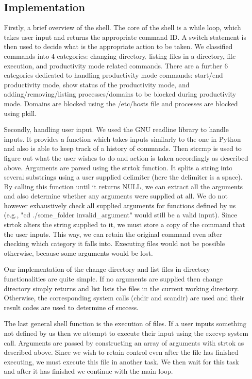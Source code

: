 \documentclass{article}
\begin{document}
\subsection{Implementation}

Firstly, a brief overview of the shell. The core of the shell is a while loop, which takes user input and returns the appropriate command ID. A switch statement is then used to decide what is the appropriate action to be taken. We classified commands into 4 categories: changing directory, listing files in a directory, file execution, and productivity mode related commands. There are a further 6 categories dedicated to handling productivity mode commands: start/end productivity mode, show status of the productivity mode, and adding/removing/listing processes/domains to be blocked during productivity mode. Domains are blocked using the /etc/hosts file and processes are blocked using pkill.

Secondly, handling user input. We used the GNU readline library to handle inputs. It provides a function which takes inputs similarly to the one in Python and also is able to keep track of a history of commands.  Then strcmp is used to figure out what the user wishes to do and action is taken accordingly as described above. Arguments are parsed using the strtok function. It splits a string into several substrings using a user supplied delimiter (here the delimiter is a space). By calling this function until it returns NULL, we can extract all the arguments and also determine whether any arguments were supplied at all. We do not however exhaustively check all supplied arguments for functions defined by us (e.g., "cd ./some\_folder invalid\_argument" would still be a valid input). Since strtok alters the string supplied to it, we must store a copy of the command that the user inputs. This way, we can retain the original command even after checking which category it falls into. Executing files would not be possible otherwise, because some arguments would be lost.

Our implementation of the change directory and list files in directory functionalities are quite simple. If no arguments are supplied then change directory simply returns and list lists the files in the current working directory. Otherwise, the corresponding system calls (chdir and scandir) are used and their result codes are used to determine of success.

The last general shell function is the execution of files. If a user inputs something not defined by us then we attempt to execute their input using the execvp system call. Arguments are passed by constructing an array of arguments with strtok as described above. Since we wish to retain control even after the file has finished executing, we must execute this file in another task. We then wait for this task and after it has finished we continue with the main loop.
\end{document}
